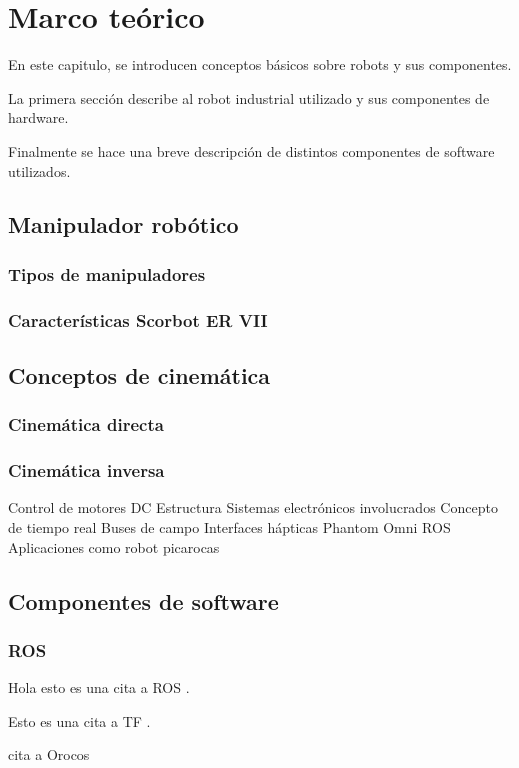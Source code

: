 \chapter{Marco teórico}

En este capitulo, se introducen conceptos básicos sobre robots y sus componentes.

La primera sección describe al robot industrial utilizado y sus componentes de hardware.

Finalmente se hace una breve descripción de distintos componentes de software utilizados.


\section{Manipulador robótico}

\subsection{Tipos de manipuladores}

\subsection{Características Scorbot ER VII}

\section{Conceptos de cinemática}

\subsection{Cinemática directa}

\subsection{Cinemática inversa}



Control de motores DC
Estructura
Sistemas electrónicos involucrados
Concepto de tiempo real
Buses de campo
Interfaces hápticas
Phantom Omni
ROS
Aplicaciones como robot picarocas


\section{Componentes de software}

\subsection{ROS}

Hola esto es una cita a ROS \cite{quigley2009}.



Esto es una cita a TF \cite{foote2013}.

cita a Orocos \cite{orocos2001}

\cite{craig1989}

\cite{gier2015}

\cite{diankov2010}

